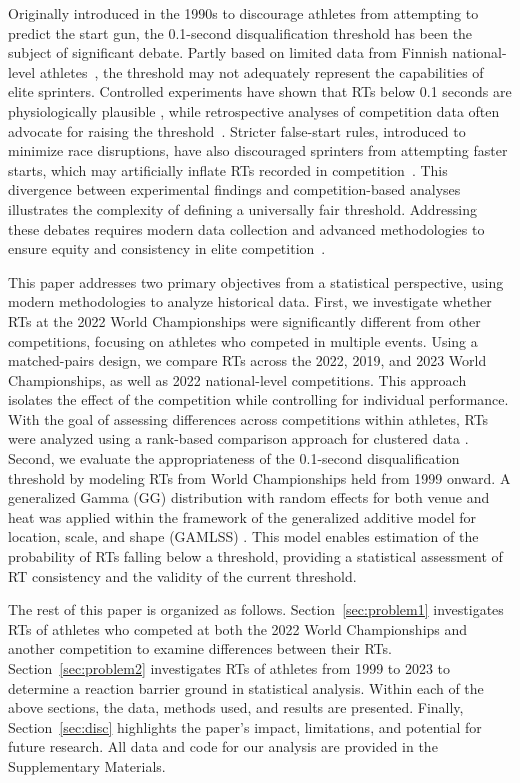 \documentclass[12pt, letterpaper]{article}
\begin{document}
Originally introduced in the 1990s to discourage athletes from attempting
to predict the start gun, the 0.1-second disqualification threshold 
has been the subject of significant debate.   Partly based on limited
data from Finnish national-level athletes~\citep{mero1990reaction}, the
threshold may not adequately represent the capabilities of elite
sprinters. Controlled experiments have shown that RTs below
0.1 seconds are physiologically plausible \citep{pain2007sprint,
  komi2009iaaf}, while retrospective analyses of competition data
often advocate for raising the threshold~\citep{brosnan2017effects,
  lipps2011implications}. Stricter false-start rules, introduced to
minimize race disruptions, have also discouraged sprinters from
attempting faster starts, which may artificially inflate RTs recorded
in competition~\citep{haugen2013effect}. This divergence between
experimental findings and competition-based analyses illustrates the
complexity of defining a universally fair threshold. Addressing these
debates requires modern data collection and advanced methodologies to
ensure equity and consistency in elite
competition~\citep{milloz2021sprint}.


This paper addresses two primary objectives from a statistical
perspective, using modern methodologies to analyze historical
data. First, we investigate whether RTs at the 2022
World Championships were significantly different from other
competitions, focusing on athletes who competed in multiple
events. Using a matched-pairs design, we compare RTs across the 2022,
2019, and 2023 World Championships, as well as 2022 national-level
competitions. This approach isolates the effect of the competition
 while controlling for individual performance. With the goal of assessing 
differences across competitions within athletes, RTs were analyzed using a 
rank-based comparison approach for clustered data \citep{datta2005rank}. Second, 
we evaluate
the appropriateness of the 0.1-second disqualification threshold by
modeling RTs from World Championships held from 1999 onward. A
generalized Gamma (GG) distribution with random effects for both venue and
heat was applied within the framework of the generalized additive
model for location, scale, and shape (GAMLSS)
\citep{rigby2005generalized, stasinopoulos2024generalized}.
This model enables estimation of the
probability of RTs falling below a threshold, providing a
statistical assessment of RT consistency and the validity of the
current threshold.


The rest of this paper is organized as follows. Section~\ref{sec:problem1}
investigates RTs of athletes who competed at both the 2022 World Championships 
and another competition to examine differences between their RTs.  
Section~\ref{sec:problem2}
investigates RTs of athletes from 1999 to 2023 to determine a reaction barrier
ground in statistical analysis.  Within each of the above sections, the data,
methods used, and results are presented.
Finally, Section~\ref{sec:disc} highlights the
paper’s impact, limitations, and potential for future research.
All data and code for our analysis are provided in the Supplementary
Materials.
\end{document}
